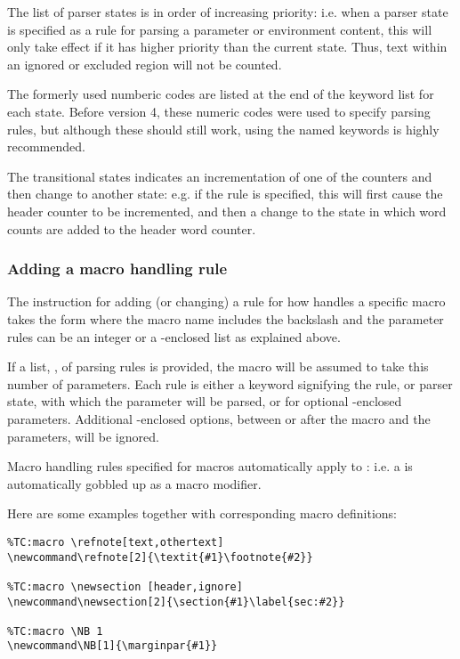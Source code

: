 \documentclass{article}
\begin{document}
The list of parser states is in order of increasing priority: i.e. when a parser state is specified as a rule for parsing a parameter or environment content, this will only take effect if it has higher priority than the current state. Thus, text within an ignored or excluded region will not be counted.

The formerly used numberic codes are listed at the end of the keyword list for each state. Before version 4, these numeric codes were used to specify parsing rules, but although these should still work, using the named keywords is highly recommended.

The transitional states indicates an incrementation of one of the counters and then change to another state: e.g. if the  rule is specified, this will first cause the header counter to be incremented, and then a change to the  state in which word counts are added to the header word counter. 

\subsubsection{Adding a macro handling rule}

The \TeXcount{} instruction for adding (or changing) a rule for how \TeXcount{} handles a specific macro takes the form
where the macro name includes the backslash and the parameter rules can be an integer or a \code{[]}-enclosed list as explained above.

If a list, , of parsing rules is provided, the macro will be assumed to take this number of parameters. Each rule is either a keyword signifying the rule, or parser state, with which the parameter will be parsed, or  for optional \code{[]}-enclosed parameters. Additional \code{[]}-enclosed options, between or after the macro and the parameters, will be ignored.

Macro handling rules specified for macros  automatically apply to : i.e. a \code{*} is automatically gobbled up as a macro modifier. 

Here are some examples together with corresponding macro definitions:

\begin{lstlisting}
%TC:macro \refnote[text,othertext]
\newcommand\refnote[2]{\textit{#1}\footnote{#2}}

%TC:macro \newsection [header,ignore]
\newcommand\newsection[2]{\section{#1}\label{sec:#2}}

%TC:macro \NB 1
\newcommand\NB[1]{\marginpar{#1}}
\end{lstlisting}
\end{document}
